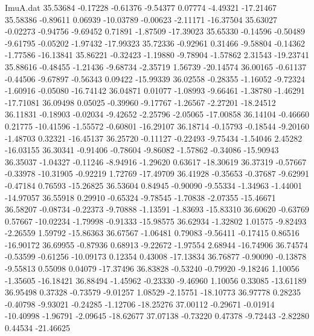 \begin{filecontents}{ImuA.dat}
  35.53684   -0.17228   -0.61376   -9.54377    0.07774   -4.49321  -17.21467
  35.58386   -0.89611    0.06939  -10.03789   -0.00623   -2.11171  -16.37504
  35.63027   -0.02273   -0.94756   -9.69452    0.71891   -1.87509  -17.39023
  35.65330   -0.14596   -0.50489   -9.61795   -0.05202   -1.97432  -17.99323
  35.72336   -0.92961    0.31466   -9.58804   -0.14362   -1.77586  -16.13841
  35.86221   -0.32423   -1.19880   -9.78904   -1.57862    2.31543  -19.23741
  35.88616   -0.48455   -1.21436   -9.68734   -2.35719    1.56739  -20.14574
  36.00165   -0.61137   -0.44506   -9.67897   -0.56343    0.09422  -15.99339
  36.02558   -0.28355   -1.16052   -9.72324   -1.60916   -0.05080  -16.74142
  36.04871    0.01077   -1.08993   -9.66461   -1.38780   -1.46291  -17.71081
  36.09498    0.05025   -0.39960   -9.17767   -1.26567   -2.27201  -18.24512
  36.11831   -0.18903   -0.02034   -9.42652   -2.25796   -2.05065  -17.00858
  36.14104   -0.46660    0.21775  -10.41596   -1.55572   -0.60801  -16.29107
  36.18714   -0.15793   -0.18544   -9.20160   -1.48703    0.32321  -16.45137
  36.25720   -0.11127   -0.22493   -9.75434   -1.54046    2.45282  -16.03155
  36.30341   -0.91406   -0.78604   -9.86082   -1.57862   -0.34086  -15.90943
  36.35037   -1.04327   -0.11246   -8.94916   -1.29620    0.63617  -18.30619
  36.37319   -0.57667   -0.33978  -10.31905   -0.92219    1.72769  -17.49709
  36.41928   -0.35653   -0.37687   -9.62991   -0.47184    0.76593  -15.26825
  36.53604    0.84945   -0.90090   -9.55334   -1.34963   -1.44001  -14.97057
  36.55918    0.29910   -0.65324   -9.78545   -1.70838   -2.07355  -15.46671
  36.58207   -0.08734   -0.22373   -9.70888   -1.13591   -1.83693  -15.83310
  36.60620   -0.63769    0.57667  -10.02234   -1.79998   -0.91333  -15.98575
  36.62934   -1.32802    1.01575   -9.82493   -2.26559    1.59792  -15.86363
  36.67567   -1.06481    0.79083   -9.56411   -0.17415    0.86516  -16.90172
  36.69955   -0.87936    0.68913   -9.22672   -1.97554    2.68944  -16.74906
  36.74574   -0.53599   -0.61256  -10.09173    0.12354    0.43008  -17.13834
  36.76877   -0.90090   -0.13878   -9.55813    0.55098    0.04079  -17.37496
  36.83828   -0.53240   -0.79920   -9.18246    1.10056   -1.35605  -16.18421
  36.88494   -1.45962   -0.23330   -9.46960    1.10056    0.33085  -13.61189
  36.95498    0.37328   -0.73579   -9.01257    1.08529   -2.15751  -18.10773
  36.97778    0.28235   -0.40798   -9.93021   -0.24285   -1.12706  -18.25276
  37.00112   -0.29671   -0.01914  -10.40998   -1.96791   -2.09645  -18.62677
  37.07138   -0.73220    0.47378   -9.72443   -2.82280    0.44534  -21.46625

\end{filecontents}
